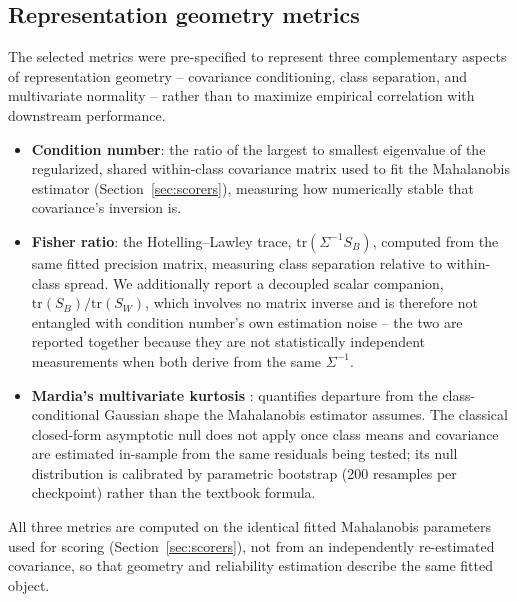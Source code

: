 \subsection{Representation geometry metrics}
\label{app:geometry-metrics}

The selected metrics were pre-specified to represent three complementary aspects of representation geometry -- covariance conditioning, class separation, and multivariate normality -- rather than to maximize empirical correlation with downstream performance.

\begin{itemize}
\item \textbf{Condition number}: the ratio of the largest to smallest eigenvalue of the regularized, shared within-class covariance matrix used to fit the Mahalanobis estimator (Section~\ref{sec:scorers}), measuring how numerically stable that covariance's inversion is.
\item \textbf{Fisher ratio}: the Hotelling--Lawley trace, $\mathrm{tr}(\Sigma^{-1} S_B)$, computed from the same fitted precision matrix, measuring class separation relative to within-class spread. We additionally report a decoupled scalar companion, $\mathrm{tr}(S_B)/\mathrm{tr}(S_W)$, which involves no matrix inverse and is therefore not entangled with condition number's own estimation noise -- the two are reported together because they are not statistically independent measurements when both derive from the same $\Sigma^{-1}$.
\item \textbf{Mardia's multivariate kurtosis} \citep{mardia1970measures}: quantifies departure from the class-conditional Gaussian shape the Mahalanobis estimator assumes. The classical closed-form asymptotic null does not apply once class means and covariance are estimated in-sample from the same residuals being tested; its null distribution is calibrated by parametric bootstrap (200 resamples per checkpoint) rather than the textbook formula.
\end{itemize}

All three metrics are computed on the identical fitted Mahalanobis parameters used for scoring (Section~\ref{sec:scorers}), not from an independently re-estimated covariance, so that geometry and reliability estimation describe the same fitted object.

